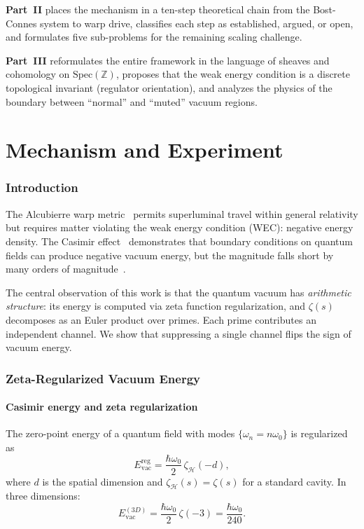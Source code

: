 \documentclass[11pt,a4paper]{article}
\newcommand{\Spec}{\mathrm{Spec}}
\begin{document}
\textbf{Part~II} places the mechanism in a ten-step theoretical
chain from the Bost-Connes system to warp drive, classifies each
step as established, argued, or open, and formulates five
sub-problems for the remaining scaling challenge.

\textbf{Part~III} reformulates the entire framework in the language
of sheaves and cohomology on $\Spec(\mathbb{Z})$, proposes that the
weak energy condition is a discrete topological invariant
(regulator orientation), and analyzes the physics of the boundary
between ``normal'' and ``muted'' vacuum regions.

\newpage
\part{Mechanism and Experiment}
\label{part:mechanism}

\section{Introduction}

The Alcubierre warp metric~\cite{Alcubierre1994} permits superluminal
travel within general relativity but requires matter violating the
weak energy condition (WEC): negative energy density.
The Casimir effect~\cite{Casimir1948} demonstrates that boundary
conditions on quantum fields can produce negative vacuum energy,
but the magnitude falls short by many orders of
magnitude~\cite{PfenningFord1997}.

The central observation of this work is that the quantum vacuum has
\emph{arithmetic structure}: its energy is computed via zeta function
regularization, and $\zeta(s)$ decomposes as an Euler product over primes.
Each prime contributes an independent channel.
We show that suppressing a single channel flips the sign of vacuum energy.

\section{Zeta-Regularized Vacuum Energy}

\subsection{Casimir energy and zeta regularization}

The zero-point energy of a quantum field with modes $\{\omega_n = n\omega_0\}$
is regularized as
\begin{equation}
  E_{\mathrm{vac}}^{\mathrm{reg}} = \frac{\hbar\omega_0}{2}\,\zeta_{\mathcal{H}}(-d),
\end{equation}
where $d$ is the spatial dimension and $\zeta_{\mathcal{H}}(s) = \zeta(s)$
for a standard cavity. In three dimensions:
\begin{equation}
  E_{\mathrm{vac}}^{(3D)} = \frac{\hbar\omega_0}{2}\,\zeta(-3) = \frac{\hbar\omega_0}{240}.
\end{equation}
\end{document}

